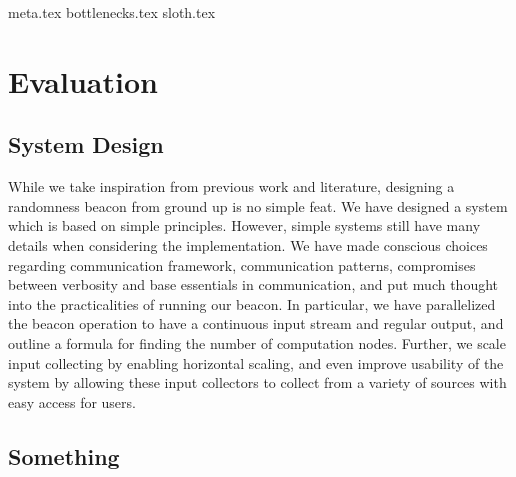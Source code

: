{meta.tex}
{bottlenecks.tex}
{sloth.tex}

\section{Evaluation}


\subsection{System Design}
While we take inspiration from previous work and literature, designing a randomness beacon from ground up is no simple feat. We have designed a system which is based on simple principles. However, simple systems still have many details when considering the implementation. We have made conscious choices regarding communication framework, communication patterns, compromises between verbosity and base essentials in communication, and put much thought into the practicalities of running our beacon. In particular, we have parallelized the beacon operation to have a continuous input stream and regular output, and outline a formula for finding the number of computation nodes. Further, we scale input collecting by enabling horizontal scaling, and even improve usability of the system by allowing these input collectors to collect from a variety of sources with easy access for users.

\subsection{Something}
